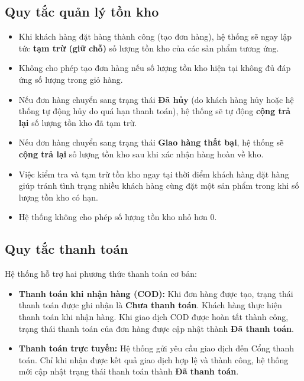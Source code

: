 \documentclass[12pt,a4paper]{article}
\begin{document}
\subsection{Quy tắc quản lý tồn kho}

\begin{itemize}
\item Khi khách hàng đặt hàng thành công (tạo đơn hàng), hệ thống sẽ ngay lập tức \textbf{tạm trừ (giữ chỗ)} số lượng tồn kho của các sản phẩm tương ứng.
\item Không cho phép tạo đơn hàng nếu số lượng tồn kho hiện tại không đủ đáp ứng số lượng trong giỏ hàng.
\item Nếu đơn hàng chuyển sang trạng thái \textbf{Đã hủy} (do khách hàng hủy hoặc hệ thống tự động hủy do quá hạn thanh toán), hệ thống sẽ tự động \textbf{cộng trả lại} số lượng tồn kho đã tạm trừ.
\item Nếu đơn hàng chuyển sang trạng thái \textbf{Giao hàng thất bại}, hệ thống sẽ \textbf{cộng trả lại} số lượng tồn kho sau khi xác nhận hàng hoàn về kho.
\item Việc kiểm tra và tạm trừ tồn kho ngay tại thời điểm khách hàng đặt hàng giúp tránh tình trạng nhiều khách hàng cùng đặt một sản phẩm trong khi số lượng tồn kho có hạn.
\item Hệ thống không cho phép số lượng tồn kho nhỏ hơn 0.
\end{itemize}


\subsection{Quy tắc thanh toán}

Hệ thống hỗ trợ hai phương thức thanh toán cơ bản:

\begin{itemize}
    \item \textbf{Thanh toán khi nhận hàng (COD):} Khi đơn hàng được tạo, trạng thái thanh toán được ghi nhận là \textbf{Chưa thanh toán}. Khách hàng thực hiện thanh toán khi nhận hàng. Khi giao dịch COD được hoàn tất thành công, trạng thái thanh toán của đơn hàng được cập nhật thành \textbf{Đã thanh toán}.

    \item \textbf{Thanh toán trực tuyến:} Hệ thống gửi yêu cầu giao dịch đến Cổng thanh toán. Chỉ khi nhận được kết quả giao dịch hợp lệ và thành công, hệ thống mới cập nhật trạng thái thanh toán thành \textbf{Đã thanh toán}.
\end{itemize}
\end{document}
